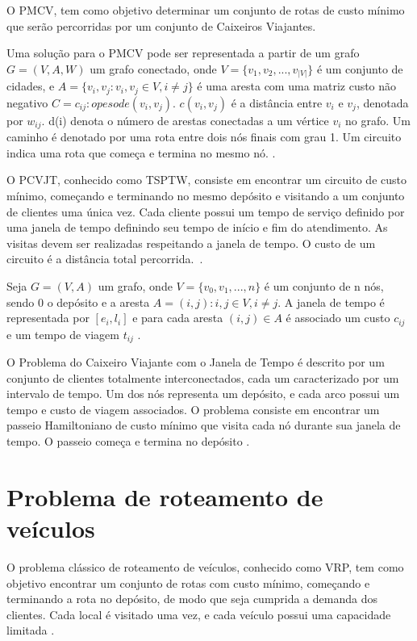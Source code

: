 O \ac{PMCV}, tem como objetivo determinar um conjunto de rotas de custo mínimo que serão percorridas por um conjunto de Caixeiros Viajantes.

Uma solução para o \ac{PMCV} pode ser representada a partir de um grafo $G = (V,A,W)$ um grafo conectado, onde $V = \{v_1, v_2, ..., v_{|V|}\}$ é um conjunto de cidades, e $A = \{ v_i,v_j: v_i,v_j \in V, i \neq j\}$ é uma aresta com uma matriz custo não negativo $C = {c_{ij}: o peso de (v_i,v_j)}$. $c(v_i, v_j)$ é a distância entre $v_i$ e $v_j$, denotada por $w_{ij}$. d(i) denota o número de arestas conectadas a um vértice $v_i$ no grafo. Um caminho é denotado por uma rota entre dois nós finais com grau 1. Um circuito indica uma rota que começa e termina no mesmo nó. 
\cite{meng:2012}. 

O \ac{PCVJT}, conhecido como \ac{TSPTW}, consiste em encontrar um circuito de custo mínimo, começando e terminando no mesmo depósito e visitando a um conjunto de clientes uma única vez. Cada cliente possui um tempo de serviço definido por uma janela de tempo definindo seu tempo de início e fim do atendimento. As visitas devem ser realizadas respeitando a janela de tempo. O custo de um circuito é a distância total percorrida.~\cite{urrutia:2010}.

Seja $G=(V,A)$ um grafo, onde $V = \{v_0, v_1, ..., n \}$ é um conjunto de n nós, sendo $0$ o depósito e a aresta $A = {(i,j): i,j \in V, i \neq j}$. A janela de tempo é representada por $[e_i, l_i]$ e para cada aresta $(i,j) \in A$ é associado um custo $c_{ij}$ e um tempo de viagem $t_{ij}$ \cite{calvo:2000}.

O Problema do Caixeiro Viajante com o Janela de Tempo é descrito por um conjunto de clientes totalmente interconectados, cada um caracterizado por um intervalo de tempo. Um dos nós representa um depósito, e cada arco possui um tempo e custo de viagem associados. O problema consiste em encontrar um passeio Hamiltoniano de custo mínimo que visita cada nó durante sua janela de tempo. O passeio começa e termina no depósito \cite{calvo:2000}.

\section{Problema de roteamento de veículos}

O problema clássico de roteamento de veículos, conhecido como \ac{VRP}, tem como objetivo encontrar um conjunto de rotas com custo mínimo, começando e terminando a rota no depósito, de modo que seja cumprida a demanda dos clientes. Cada local é visitado uma vez, e cada veículo possui uma capacidade limitada \cite{gold:2008}.

